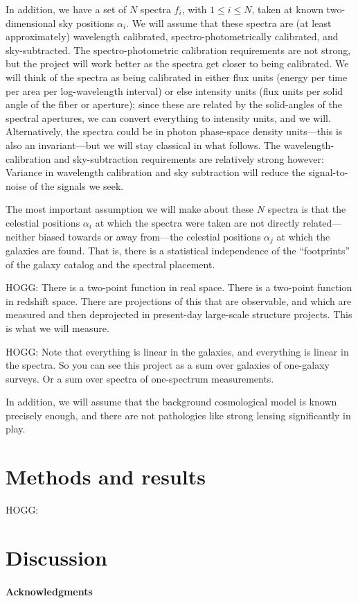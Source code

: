 \documentclass{article}
\begin{document}
In addition, we have a set of $N$ spectra $f_i$, with $1\leq i\leq N$, taken at known two-dimensional sky positions $\alpha_i$.
We will assume that these spectra are (at least approximately) wavelength calibrated, spectro-photometrically calibrated, and sky-subtracted.
The spectro-photometric calibration requirements are not strong, but the project will work better as the spectra get closer to being calibrated.
We will think of the spectra as being calibrated in either flux units (energy per time per area per log-wavelength interval) or else intensity units (flux units per solid angle of the fiber or aperture); since these are related by the solid-angles of the spectral apertures, we can convert everything to intensity units, and we will.
Alternatively, the spectra could be in photon phase-space density units---this is also an invariant---but we will stay classical in what follows.
The wavelength-calibration and sky-subtraction requirements are relatively strong however:
Variance in wavelength calibration and sky subtraction will reduce the signal-to-noise of the signals we seek.

The most important assumption we will make about these $N$ spectra is that the celestial positions $\alpha_i$ at which the spectra were taken are not directly related---neither biased towards or away from---the celestial positions $\alpha_j$ at which the galaxies are found.
That is, there is a statistical independence of the ``footprints'' of the galaxy catalog and the spectral placement.

HOGG: There is a two-point function in real space. There is a two-point function in redshift space. There are projections of this that are observable, and which are measured and then deprojected in present-day large-scale structure projects. This is what we will measure.

HOGG: Note that everything is linear in the galaxies, and everything is linear in the spectra. So you can see this project as a sum over galaxies of one-galaxy surveys. Or a sum over spectra of one-spectrum measurements.

In addition, we will assume that the background cosmological model is known precisely enough, and there are not pathologies like strong lensing significantly in play.

\section{Methods and results}
HOGG: 

\section{Discussion}

\paragraph{Acknowledgments}


\end{document}
